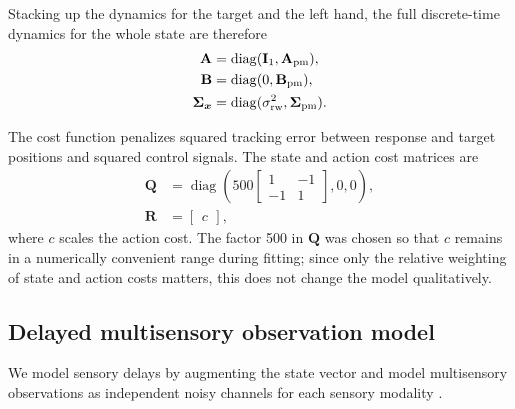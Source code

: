 \documentclass{article}
\begin{document}
Stacking up the dynamics for the target and the left hand, the full discrete-time dynamics for the whole state are therefore
\begin{align}
    \mathbf A &= \operatorname{diag}(\operatorname{{\mathbf{I}}}_1, \mathbf A_{\mathrm{pm}}), \\
    \mathbf B &= \operatorname{diag}(0, \mathbf B_{\mathrm{pm}}), \\
    \mathbf \Sigma_{\bm x} &= \operatorname{diag}(\sigma_\text{rw}^2, \mathbf \Sigma_{\mathrm{pm}}).
\end{align}

The cost function penalizes squared tracking error between response and target positions and squared control signals. The state and action cost matrices are
\begin{align}
    \mathbf Q &= \operatorname{diag}\left(500\begin{bmatrix}1 & -1 \\ -1 & 1\end{bmatrix}, 0, 0\right), \\
    \mathbf R &= \begin{bmatrix} c \end{bmatrix},
\end{align}
where $c$ scales the action cost. The factor 500 in $\mathbf Q$ was chosen so that $c$ remains in a numerically convenient range during fitting; since only the relative weighting of state and action costs matters, this does not change the model qualitatively.

\subsection{Delayed multisensory observation model}

We model sensory delays by augmenting the state vector \citep[cf.][]{izawa2008line} and model multisensory observations as independent noisy channels for each sensory modality \citep[cf.][]{crevecoeur2016dynamic,kasuga2022integration}.
\end{document}
